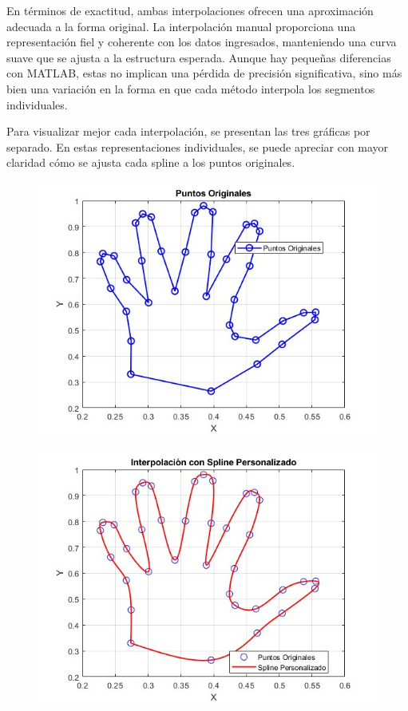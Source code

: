 \begin{homeworkProblem}
\begin{solucion}
En términos de exactitud, ambas interpolaciones ofrecen una aproximación adecuada a la forma original. La interpolación manual proporciona una representación fiel y coherente con los datos ingresados, manteniendo una curva suave que se ajusta a la estructura esperada. Aunque hay pequeñas diferencias con MATLAB, estas no implican una pérdida de precisión significativa, sino más bien una variación en la forma en que cada método interpola los segmentos individuales.  

Para visualizar mejor cada interpolación, se presentan las tres gráficas por separado. En estas representaciones individuales, se puede apreciar con mayor claridad cómo se ajusta cada spline a los puntos originales.
\begin{figure}[H]
    \centering
    \begin{minipage}{0.48\textwidth}
        \centering
        \includegraphics[width=\textwidth]{Figures/puntos originales.jpg} %
        \label{fig:imagen1}
    \end{minipage}
    \hfill
    \begin{minipage}{0.48\textwidth}
        \centering
        \includegraphics[width=\textwidth]{Figures/interpolacion propia.png} %
        \label{fig:imagen2}
    \end{minipage}


\end{figure}
\end{solucion}
\end{homeworkProblem}

